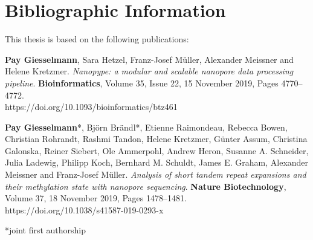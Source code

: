 \chapter*{Bibliographic Information}
\label{sec:bib}
\vspace*{-10mm}


This thesis is based on the following publications:

\textbf{Pay Giesselmann}, Sara Hetzel, Franz-Josef Müller, Alexander Meissner and Helene Kretzmer. \textit{Nanopype: a modular and scalable nanopore data processing pipeline}. \textbf{Bioinformatics}, Volume 35, Issue 22, 15 November 2019, Pages 4770–4772.\\
https://doi.org/10.1093/bioinformatics/btz461


\textbf{Pay Giesselmann}*, Björn Brändl*, Etienne Raimondeau, Rebecca Bowen, Christian Rohrandt, Rashmi Tandon, Helene Kretzmer, Günter Assum, Christina Galonska, Reiner Siebert, Ole Ammerpohl, Andrew Heron, Susanne A. Schneider, Julia Ladewig, Philipp Koch, Bernhard M. Schuldt, James E. Graham, Alexander Meissner and Franz-Josef Müller. \textit{Analysis of short tandem repeat expansions and their methylation state with nanopore sequencing}. \textbf{Nature Biotechnology}, Volume 37, 18 November 2019, Pages 1478–1481.\\
https://doi.org/10.1038/s41587-019-0293-x

*joint first authorship






